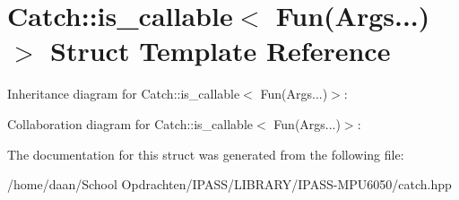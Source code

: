 \hypertarget{structCatch_1_1is__callable_3_01Fun_07Args_8_8_8_08_4}{}\section{Catch\+:\+:is\+\_\+callable$<$ Fun(Args...)$>$ Struct Template Reference}
\label{structCatch_1_1is__callable_3_01Fun_07Args_8_8_8_08_4}


Inheritance diagram for Catch\+:\+:is\+\_\+callable$<$ Fun(Args...)$>$\+:


Collaboration diagram for Catch\+:\+:is\+\_\+callable$<$ Fun(Args...)$>$\+:


The documentation for this struct was generated from the following file\+:\begin{DoxyCompactItemize}
\item 
/home/daan/\+School Opdrachten/\+I\+P\+A\+S\+S/\+L\+I\+B\+R\+A\+R\+Y/\+I\+P\+A\+S\+S-\/\+M\+P\+U6050/catch.\+hpp\end{DoxyCompactItemize}
